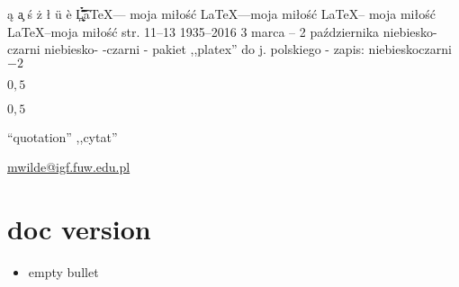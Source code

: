 \k{a} %
\c a  %
\'s   %
\.z   %
\l    %
\"u   %
\`e   %
\`    %
\'    %
\^    %
\"    %
\~    %
\=    %
\.    %
\u    %
\v    %
\H    %
\t    %
\c    %
\d    %
\b    %
\k    %


\LaTeX --- moja miłość
\LaTeX---moja miłość
\LaTeX -- moja miłość 
\LaTeX--moja miłość
str. 11--13
1935--2016
3 marca -- 2 października
niebiesko-czarni
niebiesko-
-czarni
- pakiet ,,platex'' do j. polskiego
- zapis: niebiesko{\dywiz}czarni
$-2$

$0{,}5$
\usepackage{icomma} %
$0,5$

``quotation''
,,cytat''






\null\newpage
\thispagestyle{empty}
\null\newpage %

\href{mailto:mwilde@igf.fuw.edu.pl}{mwilde@igf.fuw.edu.pl}

%
\chapter[toc version]{doc version}

%
\begin{itemize}
  \item [] empty bullet
\end{itemize}

